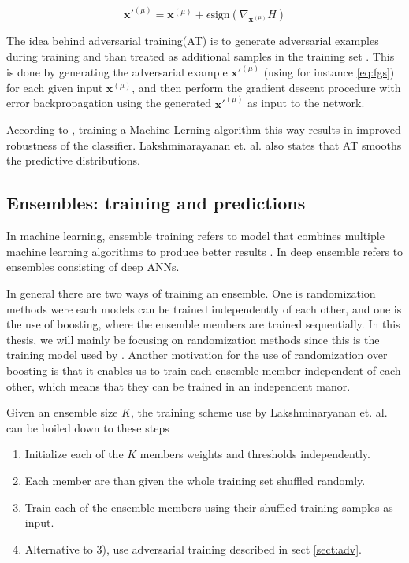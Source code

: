 \begin{equation}
    \label{eq:fgs} 
    \bm{x}'^{(\mu)} = \bm{x}^{(\mu)} + \epsilon \text{sign}({\nabla_{\bm{x}^{(\mu)}}H})
\end{equation}

The idea behind adversarial training(AT) is to generate adversarial examples during training and than treated as additional samples in the training set \cite{goodfellow2014generative}. This is done by generating the adversarial example $\bm{x}'^{(\mu)}$ (using for instance \eqref{eq:fgs}) for each given input $\bm{x}^{(\mu)}$, and then perform the gradient descent procedure with error backpropagation using the generated $\bm{x}'^{(\mu)}$ as input to the network.

According to \cite{goodfellow2014generative}, training a Machine Lerning algorithm this way results in improved robustness of the classifier. Lakshminarayanan et. al. \cite{lakshminarayanan2017simple} also states that AT smooths the predictive distributions.

\subsection{Ensembles: training and predictions}

In machine learning, ensemble training refers to model that combines multiple machine learning algorithms to produce better results \cite{lee2015m}. In deep ensemble refers to ensembles consisting of deep ANNs.

In general there are two ways of training an ensemble. One is randomization methods were each models can be trained independently of each other, and one is the use of boosting, where the ensemble members are trained sequentially\cite{zhou2002ensembling}. In this thesis, we will mainly be focusing on randomization methods since this is the training model used by \cite{lakshminarayanan2017simple}. Another motivation for the use of randomization over boosting is that it enables us to train each ensemble member independent of each other, which means that they can be trained in an independent manor.

Given an ensemble size $K$, the training scheme use by Lakshminaryanan et. al. \cite{lakshminarayanan2017simple} can be boiled down to these steps

\begin{enumerate}
    \item Initialize each of the $K$ members weights and thresholds independently.
    \item Each member are than given the whole training set shuffled randomly.
    \item Train each of the ensemble members using their shuffled training samples as input.
    \item Alternative to 3), use adversarial training described in sect \ref{sect:adv}.
\end{enumerate}

